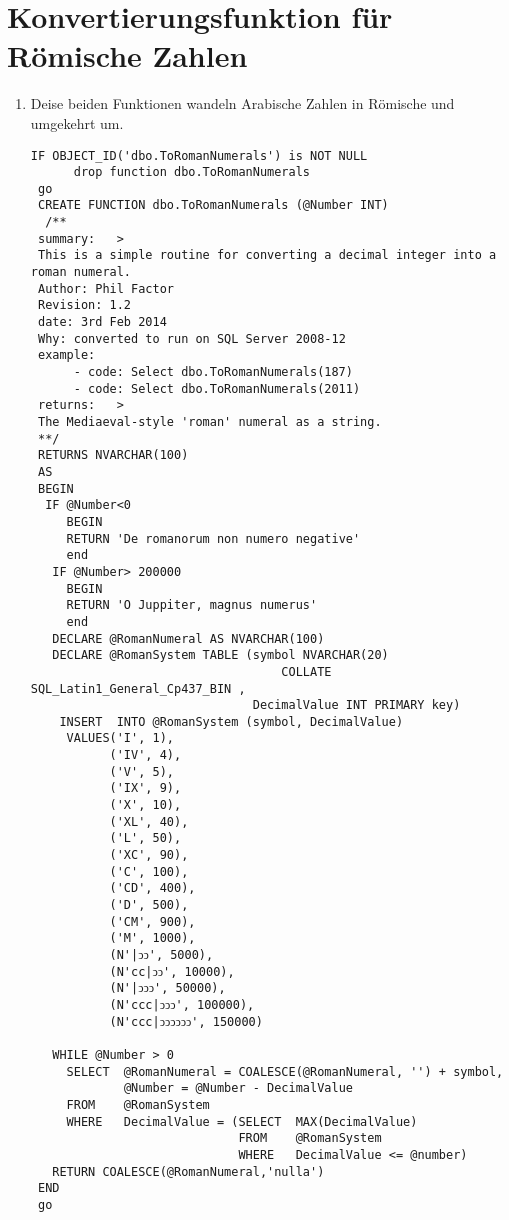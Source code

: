 \clearpage
    \section{Konvertierungsfunktion f\"ur R\"omische Zahlen}
      \begin{enumerate}
        \item Deise beiden Funktionen wandeln Arabische Zahlen in R\"omische und umgekehrt um.
        \begin{mssql}[\FALSE]
        \end{mssql}
  \begin{lstlisting}[language=ms_sql,caption={Die Fehlermeldung in SQL Server},label=sql05_04]
  IF OBJECT_ID('dbo.ToRomanNumerals') is NOT NULL
      drop function dbo.ToRomanNumerals
 go
 CREATE FUNCTION dbo.ToRomanNumerals (@Number INT)
  /**
 summary:   >
 This is a simple routine for converting a decimal integer into a roman numeral.
 Author: Phil Factor
 Revision: 1.2
 date: 3rd Feb 2014
 Why: converted to run on SQL Server 2008-12
 example:
      - code: Select dbo.ToRomanNumerals(187)
      - code: Select dbo.ToRomanNumerals(2011)
 returns:   >
 The Mediaeval-style 'roman' numeral as a string.
 **/   
 RETURNS NVARCHAR(100)
 AS
 BEGIN
  IF @Number<0
     BEGIN
     RETURN 'De romanorum non numero negative'
     end                          
   IF @Number> 200000
     BEGIN
     RETURN 'O Juppiter, magnus numerus'
     end                          
   DECLARE @RomanNumeral AS NVARCHAR(100)
   DECLARE @RomanSystem TABLE (symbol NVARCHAR(20) 
                                   COLLATE SQL_Latin1_General_Cp437_BIN ,
                               DecimalValue INT PRIMARY key)
    INSERT  INTO @RomanSystem (symbol, DecimalValue)
     VALUES('I', 1),
           ('IV', 4),
           ('V', 5),
           ('IX', 9),
           ('X', 10),
           ('XL', 40),
           ('L', 50),
           ('XC', 90),
           ('C', 100),
           ('CD', 400),
           ('D', 500),
           ('CM', 900),
           ('M', 1000),
           (N'|ↄↄ', 5000),
           (N'cc|ↄↄ', 10000),
           (N'|ↄↄↄ', 50000),
           (N'ccc|ↄↄↄ', 100000),
           (N'ccc|ↄↄↄↄↄↄ', 150000)
  
   WHILE @Number > 0
     SELECT  @RomanNumeral = COALESCE(@RomanNumeral, '') + symbol,
             @Number = @Number - DecimalValue
     FROM    @RomanSystem
     WHERE   DecimalValue = (SELECT  MAX(DecimalValue)
                             FROM    @RomanSystem
                             WHERE   DecimalValue <= @number)
   RETURN COALESCE(@RomanNumeral,'nulla')
 END
 go
  

\end{lstlisting}
\end{enumerate}
